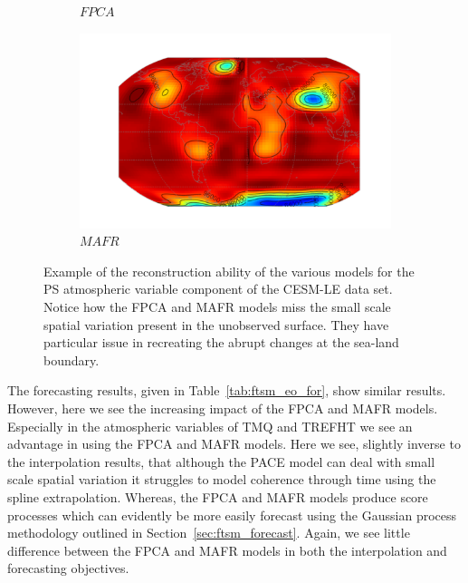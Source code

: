 \begin{figure}
\begin{subfigure}[b]{0.45\textwidth}
 		\caption{$FPCA$}
 		\label{fig:ftsm_res_ps_fpca}
 	\end{subfigure}
 	\begin{subfigure}[b]{0.45\textwidth}
 		\includegraphics[width=\textwidth]{ftsm_res_ps_example_mafr}
 		\caption{$MAFR$}
 		\label{fig:ftsm_res_ps_mafr}
 	\end{subfigure}  
 	\caption[Example of the reconstruction ability of the various models for the PS atmospheric variable component of the CESM-LE data set.]{Example of the reconstruction ability of the various models for the PS atmospheric variable component of the CESM-LE data set. Notice how the FPCA and MAFR models miss the small scale spatial variation present in the unobserved surface. They have particular issue in recreating the abrupt changes at the sea-land boundary.}
 	\label{fig:ftsm_res_ps}
 \end{figure}

The forecasting results, given in Table~\ref{tab:ftsm_eo_for}, show similar results.
However, here we see the increasing impact of the FPCA and MAFR models. 
Especially in the atmospheric variables of TMQ and TREFHT we see an advantage in using the FPCA and MAFR models.
Here we see, slightly inverse to the interpolation results, that although the PACE model can deal with small scale spatial variation it struggles to model coherence through time using the spline extrapolation.
Whereas, the FPCA and MAFR models produce score processes which can evidently be more easily forecast using the Gaussian process methodology outlined in Section~\ref{sec:ftsm_forecast}.
Again, we see little difference between the FPCA and MAFR models in both the interpolation and forecasting objectives. 


